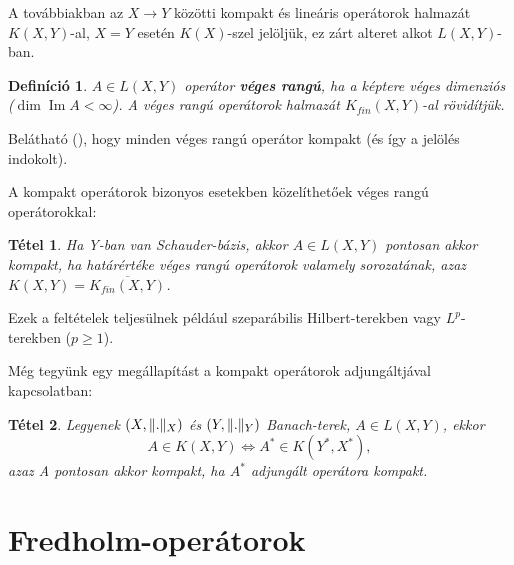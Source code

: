 \documentclass[oneside, titlepage, 12pt, a4paper]{report}
\newtheorem{theorem}{Tétel}[section]
\newtheorem{definition}{Definíció}[section]
\DeclareMathOperator{\Ima}{Im}	%
\DeclarePairedDelimiter\norm{\lVert}{\rVert}	%
\begin{document}
A továbbiakban az $X \rightarrow Y$ közötti kompakt és lineáris operátorok halmazát $K(X, Y)$-al, $X = Y$ esetén $K(X)$-szel jelöljük, ez zárt alteret alkot $L(X, Y)$-ban.
\begin{definition}
$A \in L(X, Y)$ operátor \textbf{véges rangú}, ha a képtere véges dimenziós ($\dim \Ima A < \infty$). A véges rangú operátorok halmazát $K_{fin}(X, Y)$-al rövidítjük.
\cite{funkanal,FcNotex}
\end{definition}
Belátható (\cite{funkanal}), hogy minden véges rangú operátor kompakt (és így a jelölés indokolt). \par

A kompakt operátorok bizonyos esetekben közelíthetőek véges rangú operátorokkal:
\begin{theorem}
Ha Y-ban van Schauder-bázis, akkor $A \in L(X, Y)$ pontosan akkor kompakt, ha határértéke véges rangú operátorok valamely sorozatának, azaz $K(X, Y) = \overline{K_{fin}(X, Y)}$. \cite{FcNotex}
\end{theorem}
Ezek a feltételek teljesülnek például szeparábilis Hilbert-terekben vagy $L^p$-terekben ($p \ge 1$). \par

Még tegyünk egy megállapítást a kompakt operátorok adjungáltjával kapcsolatban:
\begin{theorem}
Legyenek $(X, \norm{.}_X)$ és $(Y, \norm{.}_Y)$ Banach-terek, $A \in L(X, Y)$, ekkor
\begin{equation*}
A \in K(X, Y) \Leftrightarrow A^* \in K(Y^*, X^*),
\end{equation*}
azaz A pontosan akkor kompakt, ha $A^*$ adjungált operátora kompakt.
\cite{funkanal, lectures16and17}
\end{theorem}

%
\section{Fredholm-operátorok}
\label{sec:Fredholm}
\end{document}

